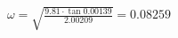 \documentclass[preview]{standalone}
\begin{document}
\begin{align*}
\omega=\sqrt{\frac{9.81\cdot\tan{0.00139}}{2.00209}}=0.08259
\end{align*}
\end{document}
